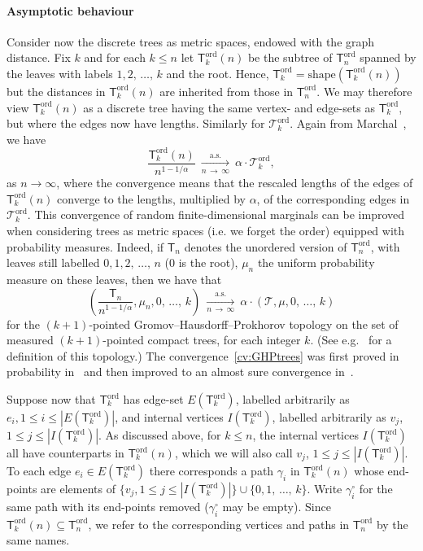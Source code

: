 \documentclass[AHL,Unicode,longabstracts,published]{cedram}
\renewcommand{\subset}{\subseteq}
\newcommand{\ord}{\mathrm{ord}}
\newcommand{\shape}{\mathrm{shape}}
\newcommand{\cT}{\mathcal{T}}
\newcommand{\sT}{\mathsf{T}}
\begin{document}
\paragraph{Asymptotic behaviour} 
Consider now the discrete trees as metric spaces, endowed with the graph distance. Fix $k$ and for each $k \leq n$ let $\sT^{\ord}_{k}(n)$ be the subtree of $\sT^{\ord}_n$ spanned by the leaves with labels $1,2,\,\ldots,\,k$ and the root. Hence, $\sT^{\ord}_k=\shape(\sT^{\ord}_{k}(n))$ but the distances in $\sT^{\ord}_{k}(n)$ are inherited from those in $\sT^{\ord}_n$. We may therefore view $\sT^{\ord}_{k}(n)$ as a discrete tree having the same vertex- and edge-sets as $\sT^{\ord}_k$, but where the edges now have lengths. Similarly for $\cT_k^{\ord}$. Again from Marchal~\cite{Marchal}, we have
\begin{equation}\label{cv:fdtrees}
\frac{\sT^{\ord}_{k}(n)}{n^{1-1/\alpha}} \ \underset{n\,\rightarrow\,\infty}{\overset{\text{a.s.}} \longrightarrow} \ \alpha \cdot \cT^{\ord}_k,
\end{equation}
as $n \to \infty$, where the convergence means that the rescaled lengths of the edges of $\sT^{\ord}_{k}(n)$ converge to the lengths, multiplied by $\alpha$, of the corresponding edges in $\cT^{\ord}_k$. This convergence of random finite-dimensional marginals can be improved when considering trees as metric spaces (i.e. we forget the order) equipped with probability measures. Indeed, if $\sT_n$ denotes the unordered version of $\sT^{\ord}_{n}$, with leaves still labelled $0,1,2,\,\ldots,\,n$ ($0$ is the root), $\mu_n$ the uniform probability measure on these leaves, then we have that
\begin{equation}\label{cv:GHPtrees}
\left(\frac{\sT_n}{n^{1-1/\alpha}}, \mu_n,0,\,\ldots,\,k\right) \ \underset{n\,\rightarrow\,\infty}{\overset{\text{a.s.}} \longrightarrow} \ \alpha \cdot \left(\cT,\mu, 0,\,\ldots,\,k\right)
\end{equation}
for the $(k+1)$-pointed Gromov--Hausdorff--Prokhorov topology on the set of measured $(k+1)$-pointed compact trees, for each integer $k$. (See e.g.~\cite[Section~6.4]{MiermontTessellations} for a definition of this topology.) The convergence~\eqref{cv:GHPtrees} was first proved in probability in~\cite[Corollary~24]{HMPW} and then improved to an almost sure convergence in~\cite[Section~2.4]{CurienHaas}.

Suppose now that $\sT^{\ord}_k$ has edge-set $E(\sT^{\ord}_k)$, labelled arbitrarily as $e_i,1 \leq i\leq |E(\sT^{\ord}_k)|$, and internal vertices $I(\sT^{\ord}_k)$, labelled arbitrarily as $v_j$, $1 \leq j \leq |I(\sT^{\ord}_k)|$. As discussed above, for $k \le n$, the internal vertices $I(\sT^{\ord}_k)$ all have counterparts in $\sT^{\ord}_{k}(n)$, which we will also call $v_j$, $1 \leq j \leq |I(\sT^{\ord}_k)|$. To each edge $e_i \in E(\sT^{\ord}_k)$ there corresponds a path $\gamma_i$ in $\sT^{\ord}_{k}(n)$ whose end-points are elements of $\{v_j, 1 \le j \le |I(\sT^{\ord}_k)|\} \cup \{0,1,\,\ldots,\,k\}$. Write $\gamma_i^{\circ}$ for the same path with its end-points removed ($\gamma_i^{\circ}$ may be empty). Since $\sT^{\ord}_{k}(n) \subset \sT^{\ord}_n$, we refer to the corresponding vertices and paths in $\sT^{\ord}_n$ by the same names.
\end{document}

